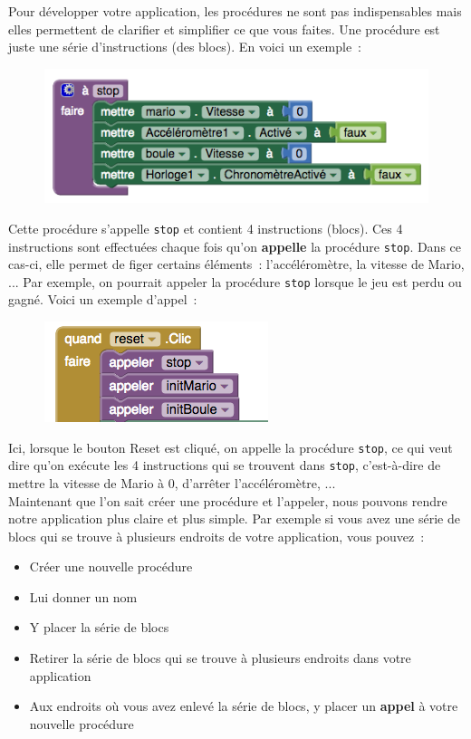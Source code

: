 \documentclass[12t,a4paper]{article}
\begin{document}
Pour développer votre application, les procédures ne sont pas indispensables mais elles permettent de clarifier et simplifier ce que vous faites. Une procédure est juste une série d'instructions (des blocs). En voici un exemple~:

\begin{figure}[h!]
\centering
\includegraphics[scale=0.6]{exemple-proc}
\end{figure}

Cette procédure s'appelle \texttt{stop} et contient 4 instructions (blocs). Ces 4 instructions sont effectuées chaque fois qu'on \textbf{appelle} la procédure \texttt{stop}. Dans ce cas-ci, elle permet de figer certains éléments~: l'accéléromètre, la vitesse de Mario, ... Par exemple, on pourrait appeler la procédure \texttt{stop} lorsque le jeu est perdu ou gagné. Voici un exemple d'appel~:

\begin{figure}[h!]
\centering
\includegraphics[scale=0.6]{exemple-proc-call}
\end{figure}

Ici, lorsque le bouton Reset est cliqué, on appelle la procédure \texttt{stop}, ce qui veut dire qu'on exécute les 4 instructions qui se trouvent dans \texttt{stop}, c'est-à-dire de mettre la vitesse de Mario à 0, d'arrêter l'accéléromètre, ... \\

Maintenant que l'on sait créer une procédure et l'appeler, nous pouvons rendre notre application plus claire et plus simple. Par exemple si vous avez une série de blocs qui se trouve à plusieurs endroits de votre application, vous pouvez~:

\begin{itemize}
\item Créer une nouvelle procédure
\item Lui donner un nom
\item Y placer la série de blocs
\item Retirer la série de blocs qui se trouve à plusieurs endroits dans votre application
\item Aux endroits où vous avez enlevé la série de blocs, y placer un \textbf{appel} à votre nouvelle procédure
\end{itemize}
\end{document}
